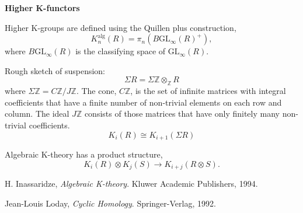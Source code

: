 \documentclass[12pt]{article}
\newcommand*{\Zset}{\mathbb{Z}}
\newcommand*{\GLgrp}{\mathrm{GL}}
\theoremstyle{inlinedefn}
\theoremstyle{break}
\begin{document}
\textbf{Higher K-functors}

Higher K-groups are defined using the Quillen plus construction,
\begin{equation}
K^{\mathrm{alg}}_n(R) = \pi_n(B\GLgrp_\infty(R)^+),
\end{equation}
where $B\GLgrp_\infty(R)$ is the classifying space of $\GLgrp_\infty(R)$.

Rough sketch of suspension:
\begin{equation}
\Sigma R = \Sigma\Zset \otimes_\Zset R
\end{equation}
where $\Sigma\Zset = C\Zset/J\Zset$.
The cone, $C\Zset$, is the set of infinite matrices with integral coefficients
that have a finite number of non-trivial elements on each row and column.
The ideal $J\Zset$ consists of those matrices that have only finitely many
non-trivial coefficients.
\begin{equation}
K_i(R) \cong K_{i+1}(\Sigma R)
\end{equation}


Algebraic K-theory has a product structure,
\begin{equation}
K_i(R) \otimes K_j(S) \to K_{i+j}(R \otimes S).
\end{equation}

\begin{thebibliography}{10}
H. Inassaridze, {\em Algebraic K-theory}.
\newblock Kluwer Academic Publishers, 1994.

Jean-Louis Loday, {\em Cyclic Homology}.
\newblock Springer-Verlag, 1992.
\end{thebibliography}
\end{document}
